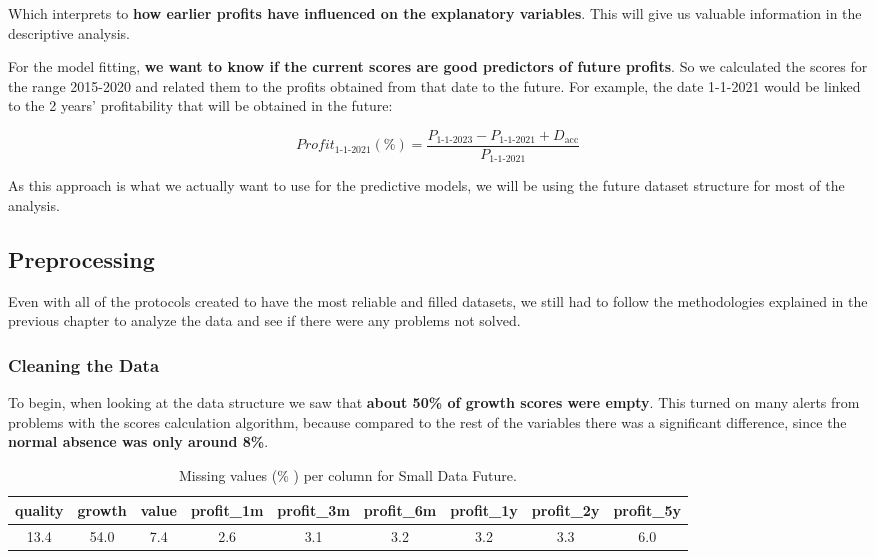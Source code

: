 \documentclass[11pt,english,a4paper,hidelinks]{book}
\begin{document}
\noindent Which interprets to \textbf{how earlier profits have influenced on the explanatory variables}. This will give us valuable information in the descriptive analysis.

\vspace{0.5cm}
\noindent For the model fitting, \textbf{we want to know if the current scores are good predictors of future profits}. So we calculated the scores for the range 2015-2020 and related them to the profits obtained from that date to the future. For example, the date 1-1-2021 would be linked to the 2 years' profitability that will be obtained in the future: 

\begin{equation}
    Profit_{1\text{-}1\text{-}2021}(\%) = \frac{P_{1\text{-}1\text{-}2023} - P_{1\text{-}1\text{-}2021} + D_{\text{acc}}}{P_{1\text{-}1\text{-}2021}}
\end{equation}

\noindent As this approach is what we actually want to use for the predictive models, we will be using the future dataset structure for most of the analysis.

\subsection{Preprocessing}
Even with all of the protocols created to have the most reliable and filled datasets, we still had to follow the methodologies explained in the previous chapter to analyze the data and see if there were any problems not solved.

\subsubsection{Cleaning the Data}
To begin, when looking at the data structure we saw that \textbf{about 50\% of growth scores were empty}. This turned on many alerts from problems with the scores calculation algorithm, because compared to the rest of the variables there was a significant difference, since the \textbf{normal absence was only around 8\%}.
\begin{table}[H]
    \centering
    \caption{Missing values (\% ) per column for Small Data Future.}
    \begin{tabular}{|c|c|c|c|c|c|c|c|c|}
        \hline
        \textbf{quality} & \textbf{growth} & \textbf{value} & \textbf{profit\_1m} & \textbf{profit\_3m} & \textbf{profit\_6m} & \textbf{profit\_1y} & \textbf{profit\_2y} & \textbf{profit\_5y} \\
        \hline
        13.4 & 54.0 & 7.4 & 2.6 & 3.1 & 3.2 & 3.2 & 3.3 & 6.0 \\
        \hline
    \end{tabular}
    \label{tab:missing_values_small_data_future}
\end{table}
\end{document}
